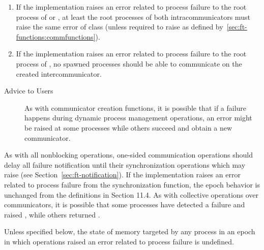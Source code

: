 \begin{enumerate}

    \item If the \mpi implementation raises an error related to process
        failure to the root process of  or
        , at least the root processes of both
        intracommunicators must raise the same error of class
         (unless required to raise
         as defined by~\ref{sec:ft-functions:commfunctions}).

    \item If the \mpi implementation raises an error related to
        process failure to the root process of , no spawned
        processes should be able to communicate on the created
        intercommunicator.

\end{enumerate}

\begin{description}

\item[Advice to Users] {As with communicator creation functions, it is
possible that if a failure happens during dynamic process management
operations, an error might be raised at some processes while others succeed
and obtain a new communicator.}

\end{description}

\label{sec:ft-notification:one-sided}


As with all nonblocking operations, one-sided communication operations should
delay all failure notification until their synchronization operations which may raise
 (see Section~\ref{sec:ft-notification}). If the
implementation raises an error related to process failure from the
synchronization function, the epoch behavior is unchanged from the definitions
in Section 11.4. As with collective operations over \mpi communicators, it is
possible that some processes have detected a failure and raised
, while others returned . 


Unless specified below, the state of memory
targeted by any process in an epoch in which operations raised an error
related to process failure is undefined.

